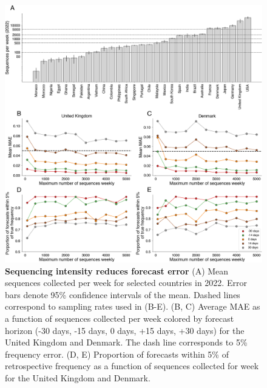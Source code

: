 \documentclass[11pt,oneside,letterpaper]{article}
\begin{document}
\begin{figure}[tb!]
    \centering
    \includegraphics[width=1.0\linewidth]{figures/downscaling_sequencing.png}
    \caption{
			\textbf{Sequencing intensity reduces forecast error}
    	(A) Mean sequences collected per week for selected countries in 2022.
			Error bars denote 95\% confidence intervals of the mean.
			Dashed lines correspond to sampling rates used in (B-E).
    	(B, C) Average MAE as a function of sequences collected per week colored by forecast horizon (-30 days, -15 days, 0 days, +15 days, +30 days) for the United Kingdom and Denmark.
			The dash line corresponds to 5\% frequency error.
    	(D, E) Proportion of forecasts within 5\% of retrospective frequency as a function of sequences collected for week for the United Kingdom and Denmark.
  	}
    \label{fig:downscaling}
\end{figure}
\end{document}
